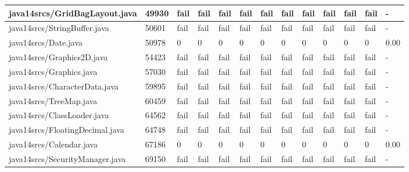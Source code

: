 \begin{tabular}{|l|l|l|l|l|l|l|l|l|l|l|l|l|}
\hline
java14srcs/GridBagLayout.java                      & 49930       & fail      & fail      & fail      & fail      & fail      & fail      & fail      & fail      & fail      & fail      & -         \\
\hline
java14srcs/StringBuffer.java                       & 50601       & fail      & fail      & fail      & fail      & fail      & fail      & fail      & fail      & fail      & fail      & -         \\
\hline
java14srcs/Date.java                               & 50978       & 0         & 0         & 0         & 0         & 0         & 0         & 0         & 0         & 0         & 0         & 0.00      \\
\hline
java14srcs/Graphics2D.java                         & 54423       & fail      & fail      & fail      & fail      & fail      & fail      & fail      & fail      & fail      & fail      & -         \\
\hline
java14srcs/Graphics.java                           & 57030       & fail      & fail      & fail      & fail      & fail      & fail      & fail      & fail      & fail      & fail      & -         \\
\hline
java14srcs/CharacterData.java                      & 59895       & fail      & fail      & fail      & fail      & fail      & fail      & fail      & fail      & fail      & fail      & -         \\
\hline
java14srcs/TreeMap.java                            & 60459       & fail      & fail      & fail      & fail      & fail      & fail      & fail      & fail      & fail      & fail      & -         \\
\hline
java14srcs/ClassLoader.java                        & 64562       & fail      & fail      & fail      & fail      & fail      & fail      & fail      & fail      & fail      & fail      & -         \\
\hline
java14srcs/FloatingDecimal.java                    & 64748       & fail      & fail      & fail      & fail      & fail      & fail      & fail      & fail      & fail      & fail      & -         \\
\hline
java14srcs/Calendar.java                           & 67186       & 0         & 0         & 0         & 0         & 0         & 0         & 0         & 0         & 0         & 0         & 0.00      \\
\hline
java14srcs/SecurityManager.java                    & 69150       & fail      & fail      & fail      & fail      & fail      & fail      & fail      & fail      & fail      & fail      & -         \\

\end{tabular}

